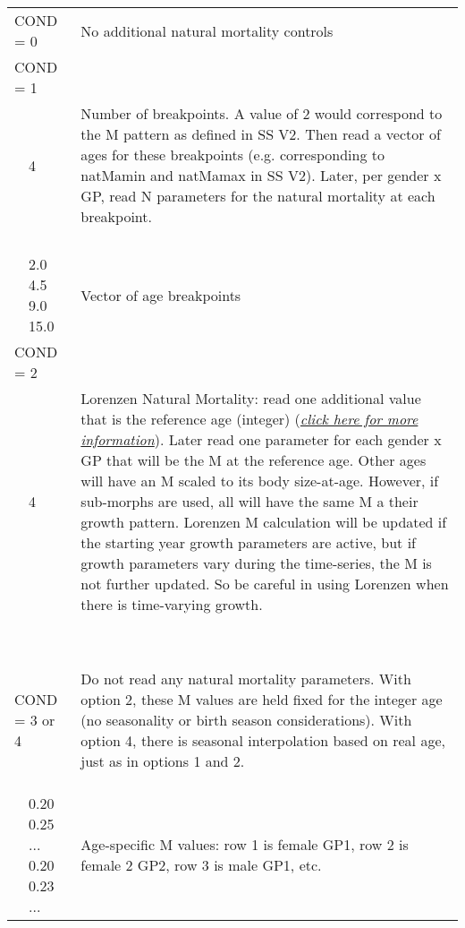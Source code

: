 \begin{center}
\begin{longtable}{p{0.5cm} p{2cm} p{12cm}}
	   \multicolumn{2}{l}{COND = 0} & No additional natural mortality controls \\
	   \multicolumn{2}{l}{COND = 1} & \\
	   & 4 & \multirow{1}{12cm}[-0.1cm]{Number of breakpoints.  A value of 2 would correspond to the M pattern as defined in SS V2.  Then read a vector of ages for these breakpoints (e.g. corresponding to natM\textunderscore amin and natM\textunderscore amax in SS V2). Later, per gender x GP, read N parameters for the natural mortality at each breakpoint.}
	   \\
	   \\
	   \\
	   \\
	   \\
	   & 2.0 4.5 9.0 15.0 & Vector of age breakpoints \\
	   \multicolumn{2}{l}{COND = 2}& \\
	   & 4 & \multirow{1}{12cm}[-0.1cm]{Lorenzen Natural Mortality: read one additional value that is the reference age (integer) (\hyperlink{Lorenzen}{\textit{click here for more information}}). Later read one parameter for each gender x GP that will be the M at the reference age.  Other ages will have an M scaled to its body size-at-age.  However, if sub-morphs are used, all will have the same M a their growth pattern.  Lorenzen M calculation will be updated if the starting year growth parameters are active, but if growth parameters vary during the time-series, the M is not further updated.  So be careful in using Lorenzen when there is time-varying growth.}\\
	   \\
	   \\
	   \\
	   \\
	   \\
	   \\
	   \\
	   \\
	   \\
	   \multicolumn{2}{l}{COND = 3 or 4} & \multirow{1}{12cm}[-0.1cm]{Do not read any natural mortality parameters.  With option 2, these M values are held fixed for the integer age (no seasonality or birth season considerations). With option 4, there is seasonal interpolation based on real age, just as in options 1 and 2.}\\
	   \\
	   \\
	   \\
	   & 0.20 0.25 ... 0.20 0.23 ... & \multirow{1}{12cm}[-0.1cm]{Age-specific M values: row 1 is female GP1, row 2 is female 2 GP2, row 3 is male GP1, etc.}\\
	   \hline


\end{longtable}
\end{center}
